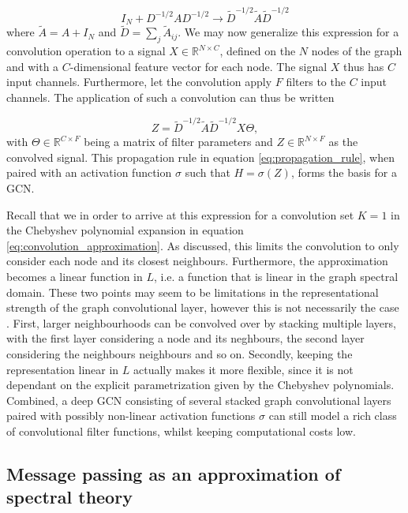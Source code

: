 \begin{equation}
    I_N + D^{-1/2}AD^{-1/2} \rightarrow \tilde{D}^{-1/2} \tilde{A} \tilde{D}^{-1/2}
    \label{eq:renormalization_trick}
\end{equation}
where $\tilde{A} = A + I_N$ and $\tilde{D} = \sum_j \tilde{A}_{ij}$.
We may now generalize this expression for a convolution operation to a signal $X \in \mathbb{R}^{N \times C}$, defined on the $N$ nodes of the graph and with a $C$-dimensional feature vector for each node. The signal $X$ thus has $C$ input channels. Furthermore, let the convolution apply $F$ filters to the $C$ input channels. The application of such a convolution can thus be written

\begin{equation}
    Z = \tilde{D}^{-1/2} \tilde{A} \tilde{D}^{-1/2} X \Theta,
    \label{eq:propagation_rule}
\end{equation}
with $\Theta \in \mathbb{R}^{C\times F}$ being a matrix of filter parameters and $Z \in \mathbb{R}^{N\times F}$ as the convolved signal. This propagation rule in equation \eqref{eq:propagation_rule}, when paired with an activation function $\sigma$ such that $H = \sigma\left(Z \right)$, forms the basis for a GCN. 

Recall that we in order to arrive at this expression for a convolution set $K=1$ in the Chebyshev polynomial expansion in equation \eqref{eq:convolution_approximation}. As discussed, this limits the convolution to only consider each node and its closest neighbours. Furthermore, the approximation becomes a linear function in $L$, i.e. a function that is linear in the graph spectral domain. These two points may seem to be limitations in the representational strength of the graph convolutional layer, however this is not necessarily the case \cite{kipf_semi_supervised}. First, larger neighbourhoods can be convolved over by stacking multiple layers, with the first layer considering a node and its neghbours, the second layer considering the neighbours neighbours and so on. Secondly, keeping the representation linear in $L$ actually makes it more flexible, since it is not dependant on the explicit parametrization given by the Chebyshev polynomials. Combined, a deep GCN consisting of several stacked graph convolutional layers paired with possibly non-linear activation functions $\sigma$ can still model a rich class of convolutional filter functions, whilst keeping computational costs low. 


\subsection{Message passing as an approximation of spectral theory}
\label{subsec:message_passing}


